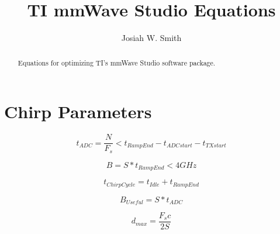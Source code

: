 \documentclass{IEEEtran}
\title{TI mmWave Studio Equations}
\author{Josiah W. Smith}
\begin{document}
\maketitle

\begin{abstract}

Equations for optimizing TI's mmWave Studio software package.

\end {abstract}



\section{Chirp Parameters}

\begin{equation}
    t_{ADC} = \frac{N}{F_s} < t_{RampEnd} - t_{ADCstart} - t_{TXstart}
\end{equation}

\begin{equation}
    B = S*t_{RampEnd} < 4GHz
\end{equation}

\begin{equation}
    t_{ChirpCycle} = t_{Idle} + t_{RampEnd}
\end{equation}

\begin{equation}
	B_{Useful} = S*t_{ADC}
\end{equation}

\begin{equation}
	d_{max} = \frac{F_s c}{2S}
\end{equation}
\end{document}
